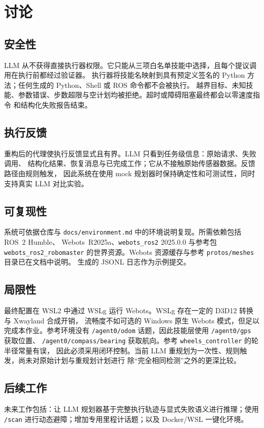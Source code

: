 \documentclass[10pt,twocolumn]{ctexart}
\begin{document}
\section{讨论}
\label{sec:discussion}

\subsection{安全性}
LLM 从不获得直接执行器权限。它只能从三项白名单技能中选择，且每个提议调用在执行前都经过验证器。
执行器将技能名映射到具有预定义签名的 Python 方法；任何生成的 Python、Shell 或 ROS 命令都不会被执行。
越界目标、未知技能、参数错误、步数超限与空计划均被拒绝。超时或障碍阻塞最终都会以零速度指令
和结构化失败报告结束。

\subsection{执行反馈}
重构后的代理使执行反馈显式且有界。LLM 只看到任务级信息：原始请求、失败调用、
结构化结果、恢复消息与已完成工作；它从不接触原始传感器数据。反馈路径由规则触发，
因此系统在使用 mock 规划器时保持确定性和可测试性，同时支持真实 LLM 对比实验。

\subsection{可复现性}
系统可依据仓库与 \texttt{docs/environment.md} 中的环境说明复现。所需依赖包括 ROS~2 Humble、
Webots~R2025a、\texttt{webots\_ros2} 2025.0.0 与参考包 \texttt{webots\_ros2\_robomaster}
的世界资源。Webots 资源缓存与参考 \texttt{protos/meshes} 目录已在文档中说明。
生成的 JSONL 日志作为示例提交。

\subsection{局限性}
最终配置在 WSL2 中通过 WSLg 运行 Webots。WSLg 存在一定的 D3D12 转换与 Xwayland 合成开销，
流畅度不如可选的 Windows 原生 Webots 模式，但足以完成本作业。参考环境没有
\texttt{/agent0/odom} 话题，因此技能层使用 \texttt{/agent0/gps} 获取位置、
\texttt{/agent0/compass/bearing} 获取航向。参考 \texttt{wheels\_controller} 的轮半径常量有误，
因此必须采用闭环控制。当前 LLM 重规划为一次性、规则触发，尚未对原始计划与重规划计划进行
除“完全相同检测”之外的更深比较。

\subsection{后续工作}
未来工作包括：让 LLM 规划器基于完整执行轨迹与显式失败语义进行推理；使用 \texttt{/scan}
进行动态避障；增加专用里程计话题；以及 Docker/WSL 一键化环境。
\end{document}
